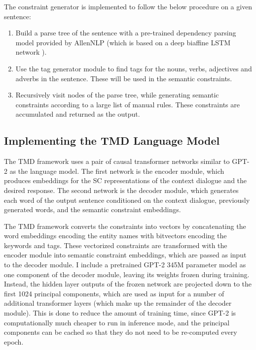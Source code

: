 \documentclass{article}
\numberwithin{equation}{section}
\begin{document}
The constraint generator is implemented to follow the below procedure on a given sentence:
\begin{enumerate}[topsep=0pt, partopsep=0pt, itemsep=2pt, parsep=0pt]
\item Build a parse tree of the sentence with a pre-trained dependency parsing model provided by AllenNLP (which is based on a deep biaffine LSTM network \cite{biaffine}).
\item Use the tag generator module to find tags for the nouns, verbs, adjectives and adverbs in the sentence. These will be used in the semantic constraints.
\item Recursively visit nodes of the parse tree, while generating semantic constraints according to a large list of manual rules. These constraints are accumulated and returned as the output.
\end{enumerate}

\subsection{Implementing the TMD Language Model}

The TMD framework uses a pair of causal transformer networks similar to GPT-2 as the language model. The first network is the encoder module, which produces embeddings for the SC representations of the context dialogue and the desired response. The second network is the decoder module, which generates each word of the output sentence conditioned on the context dialogue, previously generated words, and the semantic constraint embeddings.

The TMD framework converts the constraints into vectors by concatenating the word embeddings encoding the entity names with bitvectors encoding the keywords and tags. These vectorized constraints are transformed with the encoder module into semantic constraint embeddings, which are passed as input to the decoder module. I include a pretrained GPT-2 345M parameter model as one component of the decoder module, leaving its weights frozen during training. Instead, the hidden layer outputs of the frozen network are projected down to the first 1024 principal components, which are used as input for a number of additional transformer layers (which make up the remainder of the decoder module). This is done to reduce the amount of training time, since GPT-2 is computationally much cheaper to run in inference mode, and the principal components can be cached so that they do not need to be re-computed every epoch.
\end{document}
